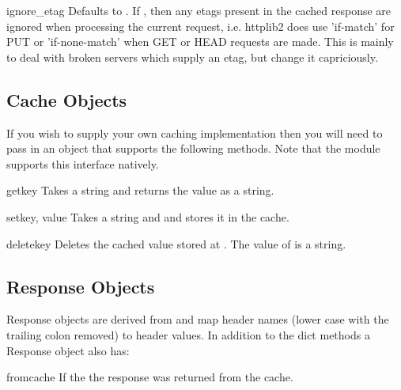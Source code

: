 \begin{memberdesc}[Http]{ignore_etag}
Defaults to . If , then any etags present in the cached response
are ignored when processing the current request, i.e. httplib2 does  use
'if-match' for PUT or 'if-none-match' when GET or HEAD requests are made. This
is mainly to deal with broken servers which supply an etag, but change it capriciously.
\end{memberdesc}

\subsection{Cache Objects}
\label{cache-objects}

If you wish to supply your own caching implementation
then you will need to pass in an object that supports the 
following methods. Note that the  module
supports this interface natively.

\begin{methoddesc}[Cache]{get}{key}
Takes a string  and returns the value as a string.
\end{methoddesc}

\begin{methoddesc}[Cache]{set}{key, value}
Takes a string  and  and stores it in the cache.
\end{methoddesc}

\begin{methoddesc}[Cache]{delete}{key}
Deletes the cached value stored at . The value
of  is a string.
\end{methoddesc}




\subsection{Response Objects}
\label{response-objects}

Response objects are derived from  and map
header names (lower case with the trailing colon removed)
to header values. In addition to the dict methods
a Response object also has:

\begin{memberdesc}[Response]{fromcache}
If  the the response was returned from the cache.
\end{memberdesc}

